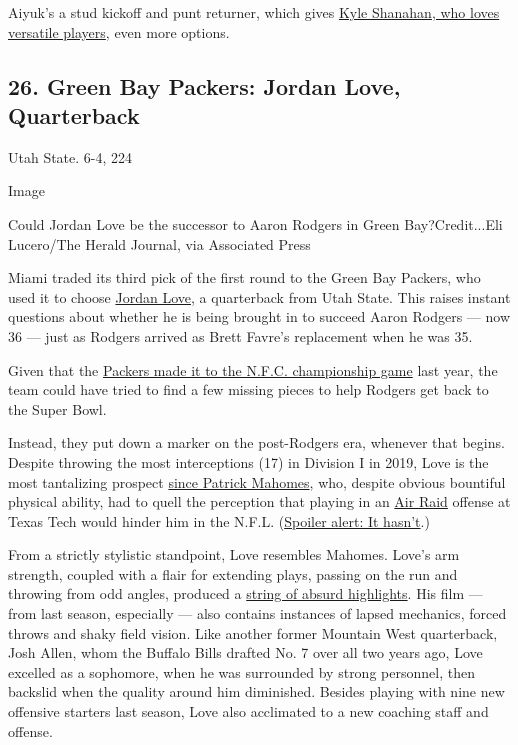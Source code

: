 Aiyuk's a stud kickoff and punt returner, which gives
\href{https://www.nytimes3xbfgragh.onion/2020/01/31/sports/football/49ers-super-bowl.html}{Kyle
Shanahan, who loves versatile players}, even more options.

\hypertarget{26-green-bay-packers-jordan-love-quarterback}{%
\subsection{26. Green Bay Packers: Jordan Love,
Quarterback}\label{26-green-bay-packers-jordan-love-quarterback}}

Utah State. 6-4, 224

Image

Could Jordan Love be the successor to Aaron Rodgers in Green
Bay?Credit...Eli Lucero/The Herald Journal, via Associated Press

Miami traded its third pick of the first round to the Green Bay Packers,
who used it to choose
\href{https://www.nytimes3xbfgragh.onion/article/jordan-love.html}{Jordan
Love}, a quarterback from Utah State. This raises instant questions
about whether he is being brought in to succeed Aaron Rodgers --- now 36
--- just as Rodgers arrived as Brett Favre's replacement when he was 35.

Given that the
\href{https://www.nytimes3xbfgragh.onion/live/2020/packers-49ers}{Packers
made it to the N.F.C. championship game} last year, the team could have
tried to find a few missing pieces to help Rodgers get back to the Super
Bowl.

Instead, they put down a marker on the post-Rodgers era, whenever that
begins. Despite throwing the most interceptions (17) in Division I in
2019, Love is the most tantalizing prospect
\href{https://www.nytimes3xbfgragh.onion/2020/01/30/sports/football/Chiefs-patrick-mahomes.html}{since
Patrick Mahomes}, who, despite obvious bountiful physical ability, had
to quell the perception that playing in an
\href{https://www.nytimes3xbfgragh.onion/2019/08/13/sports/air-raid-kliff-kingsbury-kyler-murray.html}{Air
Raid} offense at Texas Tech would hinder him in the N.F.L.
(\href{https://www.nytimes3xbfgragh.onion/2020/02/03/sports/football/patrick-mahomes-comeback-super-bowl.html}{Spoiler
alert: It hasn't}.)

From a strictly stylistic standpoint, Love resembles Mahomes. Love's arm
strength, coupled with a flair for extending plays, passing on the run
and throwing from odd angles, produced a
\href{https://www.youtube.com/watch?v=0ki92VlkEic}{string of absurd
highlights}. His film --- from last season, especially --- also contains
instances of lapsed mechanics, forced throws and shaky field vision.
Like another former Mountain West quarterback, Josh Allen, whom the
Buffalo Bills drafted No. 7 over all two years ago, Love excelled as a
sophomore, when he was surrounded by strong personnel, then backslid
when the quality around him diminished. Besides playing with nine new
offensive starters last season, Love also acclimated to a new coaching
staff and offense.

